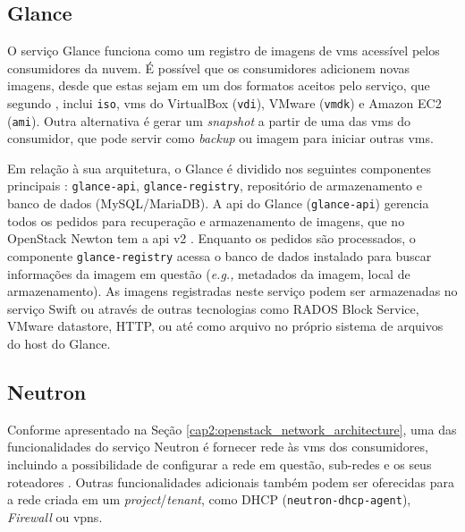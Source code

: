 \subsection{Glance}

O serviço Glance funciona como um registro de imagens de \acp{vm} acessível pelos consumidores da nuvem. 
%
É possível que os consumidores adicionem novas imagens, desde que estas sejam em um dos formatos aceitos pelo serviço, que segundo , inclui \texttt{iso}, \acp{vm} do VirtualBox (\texttt{vdi}), VMware (\texttt{vmdk}) e Amazon EC2 (\texttt{ami}).
%
Outra alternativa é gerar um \textit{snapshot} a partir de uma das \acp{vm} do consumidor, que pode servir como \textit{backup} ou imagem para iniciar outras \acp{vm}.

Em relação à sua arquitetura, o Glance é dividido nos seguintes componentes principais \cite{openstack:glance}: \texttt{glance-api}, \texttt{glance-registry}, repositório de armazenamento e banco de dados (MySQL/MariaDB).
%
A \ac{api} do Glance (\texttt{glance-api}) gerencia todos os pedidos para recuperação e armazenamento de imagens, que no OpenStack Newton tem a \ac{api} v2 \cite{openstack:newton:api}.
%
Enquanto os pedidos são processados, o componente \texttt{glance-registry} acessa o banco de dados instalado para buscar informações da imagem em questão (\textit{e.g.,} metadados da imagem, local de armazenamento).
%
As imagens registradas neste serviço podem ser armazenadas no serviço Swift ou através de outras tecnologias como RADOS Block Service, VMware datastore, HTTP, ou até como arquivo no próprio sistema de arquivos do host do Glance.


\subsection{Neutron}

Conforme apresentado na Seção \ref{cap2:openstack_network_architecture}, uma das funcionalidades do serviço Neutron é fornecer rede às \acp{vm} dos consumidores, incluindo a possibilidade de configurar a rede em questão, sub-redes e os seus roteadores \cite{redhat:components}.
%
Outras funcionalidades adicionais também podem ser oferecidas para a rede criada em um \textit{project}/\textit{tenant}, como DHCP (\texttt{neutron-dhcp-agent}), \textit{Firewall} ou \acp{vpn}.

